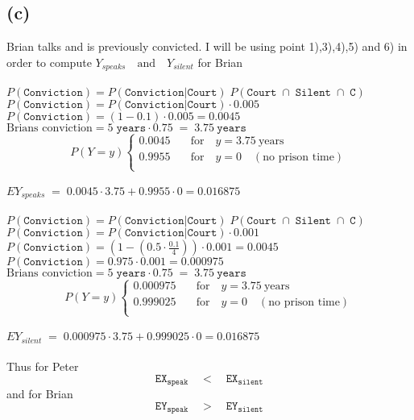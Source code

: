 \subsection{(c)}
Brian talks and is previously convicted. I will be using point 1),3),4),5) and 6) in order to compute
$Y_{speaks} \quad \text{and} \quad Y_{silent}$ for Brian
\\
\\
$ P(\mathtt{Conviction}) = P(\mathtt{Conviction} | \mathtt{Court})\; P(\mathtt{Court}\; \cap\; \mathtt{Silent}\; \cap\; \mathtt{C}) $
\\
$ P(\mathtt{Conviction}) = P(\mathtt{Conviction} | \mathtt{Court}) \cdot 0.005 $
\\
$ P(\mathtt{Conviction}) = (1 - 0.1) \cdot 0.005 = 0.0045$
\\
$ \text{Brians conviction} = 5\; \mathtt{years} \cdot 0.75\; =\; 3.75\ \mathtt{years} $
\\
\[P(Y = y) \begin{cases}
    0.0045 & \quad \text{for} \quad y = 3.75\ \text{years} \\
    0.9955 & \quad \text{for} \quad y = 0 \quad (\text{no prison time}) \\
 \end{cases}
\]
\\
$EY_{speaks}\; =\; 0.0045 \cdot 3.75 +0.9955 \cdot 0 = 0.016875$
\\
\\
$ P(\mathtt{Conviction}) = P(\mathtt{Conviction} | \mathtt{Court})\; P(\mathtt{Court}\; \cap\; \mathtt{Silent}\; \cap\; \mathtt{C}) $
\\
$ P(\mathtt{Conviction}) = P(\mathtt{Conviction} | \mathtt{Court}) \cdot 0.001 $
\\
$ P(\mathtt{Conviction}) = (1 - (0.5 \cdot \frac{0.1}{4})) \cdot 0.001 = 0.0045$
\\
$ P(\mathtt{Conviction}) = 0.975 \cdot 0.001 = 0.000975 $
\\
$ \text{Brians conviction} = 5\; \mathtt{years} \cdot 0.75\; =\; 3.75\ \mathtt{years} $
\\
\[P(Y = y) \begin{cases}
    0.000975 & \quad \text{for} \quad y = 3.75\ \text{years} \\
    0.999025 & \quad \text{for} \quad y = 0 \quad (\text{no prison time}) \\
 \end{cases}
\]
\\
$EY_{silent}\; =\; 0.000975 \cdot 3.75 + 0.999025 \cdot 0 = 0.016875$
\\
\\
Thus for Peter
$$\mathtt{EX_{speak}} \quad < \quad \mathtt{EX_{silent}}$$
and for Brian
$$\mathtt{EY_{speak}} \quad > \quad \mathtt{EY_{silent}}$$